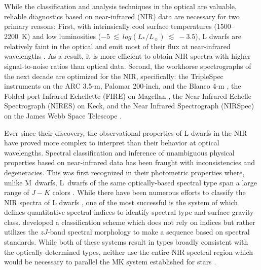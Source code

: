 \documentclass[12pt,preprint]{aastex}
\begin{document}
While the classification and analysis techniques in the optical are valuable, reliable diagnostics based on near-infrared (NIR) data are necessary for two primary reasons:
First, with intrinsically cool surface temperatures (1500--2200~K) and low luminosities ($-5~\lesssim~log(L_*/L_\sun)~\lesssim~-3.5$), L dwarfs are relatively faint in the optical and emit most of their flux at near-infrared wavelengths \citep[e.g.,][]{Filippazzo:2015dv}.
As a result, it is more efficient to obtain NIR spectra with higher signal-to-noise ratios than optical data.
Second, the workhorse spectrographs of the next decade are optimized for the NIR, specifically: the TripleSpec instruments on the ARC 3.5-m, Palomar 200-inch, and the Blanco 4-m \citep{Wilson:2004he}, the Folded-port Infrared Echellette (FIRE) on Magellan \citep{Simcoe:2013kh}, the Near-Infrared Echelle Spectrograph (NIRES) on Keck, and the Near Infrared Spectrograph (NIRSpec) on the James Webb Space Telescope \citep{Ferruit:2012em}.

Ever since their discovery, the observational properties of L dwarfs in the NIR have proved more complex to interpret than their behavior at optical wavelengths.
Spectral classification and inference of unambiguous physical properties based on near-infrared data has been fraught with inconsistencies and degeneracies.
This was first recognized in their photometric properties where, unlike M~dwarfs, L~dwarfs of the same optically-based spectral type span a large range of $J-K$ colors \citep[e.g.,][]{Leggett:2003tm}.
While there have been numerous efforts to classify the NIR spectra of L dwarfs \citep{Reid01_NIR, Testi01, Geballe02}, one of the most successful is the system of \citet{Allers:2013hk} which defines quantitative spectral indices to identify spectral type and surface gravity class.
\citet{Kirkpatrick10} developed a classification scheme which does not rely on indices but rather utilizes the $zJ$-band spectral morphology to make a sequence based on spectral standards.
While both of these systems result in types broadly consistent with the optically-determined types, neither use the entire NIR spectral region which would be necessary to parallel the MK system established for stars \citep{Morgan:1984wy,Kirkpatrick05}.
\end{document}
